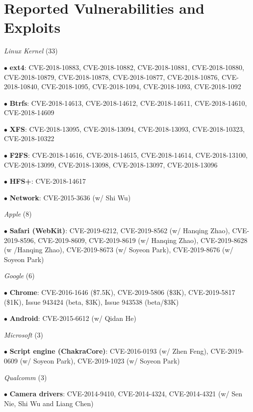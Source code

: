 \section*{Reported Vulnerabilities and Exploits}
\begin{description}
\item {\emph{Linux Kernel} (33)}
    \item $\bullet$ \textbf{ext4}: CVE-2018-10883, CVE-2018-10882, CVE-2018-10881, CVE-2018-10880, CVE-2018-10879, CVE-2018-10878, CVE-2018-10877, CVE-2018-10876, CVE-2018-10840, CVE-2018-1095, CVE-2018-1094, CVE-2018-1093, CVE-2018-1092
    \item $\bullet$ \textbf{Btrfs}: CVE-2018-14613, CVE-2018-14612, CVE-2018-14611, CVE-2018-14610, CVE-2018-14609
    \item $\bullet$ \textbf{XFS}: CVE-2018-13095, CVE-2018-13094, CVE-2018-13093, CVE-2018-10323, CVE-2018-10322
    \item $\bullet$ \textbf{F2FS}: CVE-2018-14616, CVE-2018-14615, CVE-2018-14614, CVE-2018-13100, CVE-2018-13099, CVE-2018-13098, CVE-2018-13097, CVE-2018-13096
	\item $\bullet$ \textbf{HFS+}: CVE-2018-14617
	\item $\bullet$ \textbf{Network}: CVE-2015-3636 (w/ Shi Wu)

\item {\emph{Apple} (8)}
\item $\bullet$ \textbf{Safari (WebKit)}: CVE-2019-6212, CVE-2019-8562 (w/ Hanqing Zhao), CVE-2019-8596, CVE-2019-8609, CVE-2019-8619 (w/ Hanqing Zhao), CVE-2019-8628 (w /Hanqing Zhao), CVE-2019-8673 (w/ Soyeon Park), CVE-2019-8676 (w/ Soyeon Park)

\item {\emph{Google} (6)}
\item $\bullet$ \textbf{Chrome}: CVE-2016-1646 (\$7.5K), CVE-2019-5806 (\$3K), CVE-2019-5817 (\$1K), Issue 943424 (beta, \$3K), Issue 943538 (beta/\$3K)
    \item $\bullet$ \textbf{Android}: CVE-2015-6612 (w/ Qidan He)

\item {\emph{Microsoft} (3)}
	\item $\bullet$ \textbf{Script engine (ChakraCore)}: CVE-2016-0193 (w/ Zhen Feng), CVE-2019-0609 (w/ Soyeon Park), CVE-2019-1023 (w/ Soyeon Park)

\item {\emph{Qualcomm} (3)}
	\item $\bullet$ \textbf{Camera drivers}: CVE-2014-9410, CVE-2014-4324, CVE-2014-4321 (w/ Sen Nie, Shi Wu and Liang Chen)
\end{description}

